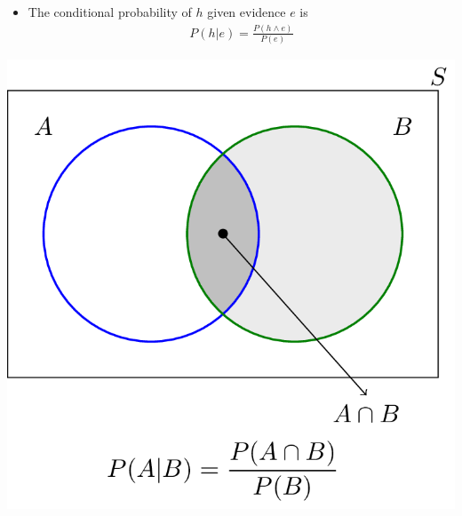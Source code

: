 \documentclass[12pt]{beamer} %
\begin{document}
\begin{slide}
\begin{itemize}
\item
The conditional probability of $h$ given evidence $e$ is
\begin{eqnarray*}
P(h|e)%
 =\frac{P(h\wedge e)}{P(e)}
\end{eqnarray*}
\end{itemize}

\begin{center}
\includegraphics[width=0.5\columnwidth]{figures/uncert_fig_conditional_b.png}
\end{center}
\end{slide}
\end{document}

